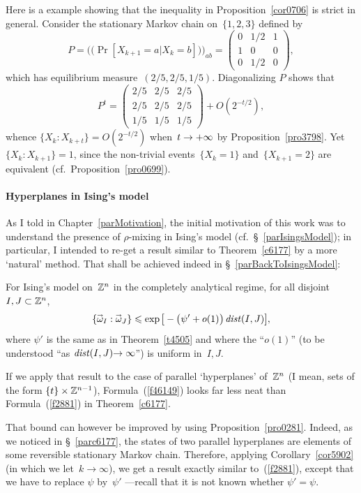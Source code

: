 \begin{Xpl}
Here is a example showing that the inequality in Proposition~\ref{cor0706}
is strict in general.
Consider the stationary Markov chain on~$\{1,2,3\}$ defined by
\[ P = \big(\!\big( \Pr[X_{k+1}=a | X_k=b] \big)\!\big)_{ab} =
\begin{pmatrix} 0&1/2&1 \\ 1&0&0 \\ 0&1/2&0 \end{pmatrix} ,\]
which has equilibrium measure~$(2/5,2/5,1/5)$.
Diagonalizing $P$ shows that
\[ P^t = \begin{pmatrix} 2/5&2/5&2/5 \\ 2/5&2/5&2/5 \\ 1/5&1/5&1/5 \end{pmatrix}
+ O(2^{-t/2}) ,\]
whence $\{ X_k:X_{k+t} \} = O(2^{-t/2})$ when~$t\to+\infty$
by Proposition~\ref{pro3798}.
Yet ${\{X_k:X_{k+1}\}} = 1$, since the non-trivial events~${\{X_k = 1\}}$
and~${\{X_{k+1}=2\}}$ are equivalent (cf.\ Proposition~\ref{pro0699}).
\end{Xpl}


\paragraph{Hyperplanes in Ising's model}\label{parHyperplanesInIsingsModel}

As I told in Chapter~\ref{parMotivation},
the initial motivation of this work
was to understand the presence of $\rho$-mixing
in Ising's model (cf.\ \S~\ref{parIsingsModel});
in particular, I intended to re-get a result similar to Theorem~\ref{c6177}
by a more `natural' method.
That shall be achieved indeed in \S~\ref{parBackToIsingsModel}:
%
\begin{Thm}
For Ising's model on~$\mathbb{Z}^n$ in the completely analytical regime,
for all disjoint $I,J\subset\mathbb{Z}^n$,
\[\label{f46149} \{ \vec\omega_I : \vec\omega_J \} \leq
\exp\big[-\big(\psi'+o(1)\big) \, \dist(I,J)\big] ,\]
where $\psi'$ is the same as in Theorem~\ref{t4505}
and where the ``$o(1)$'' (to be understood ``as $\mathit{dist}(I,J) \allowbreak {\to\infty}$'') is uniform in~$I,J$.
\end{Thm}
%
If we apply that result to the case of parallel `hyperplanes' of~$\mathbb{Z}^n$
(I mean, sets of the form $\{t\}\times\mathbb{Z}^{n-1}$),
Formula~(\ref{f46149}) looks far less neat than Formula~(\ref{f2881}) in Theorem~\ref{c6177}.

That bound can however be improved by using Proposition~\ref{pro0281}.
Indeed, as we noticed in \S~\ref{parc6177}, the states of two parallel hyperplanes
are elements of some reversible stationary Markov chain.
Therefore, applying Corollary~\ref{cor5902} (in which we let~$k\to\infty$),
we get a result exactly similar to~(\ref{f2881}),
except that we have to replace $\psi$ by~$\psi'$ —recall that it is not known whether $\psi'=\psi$.



